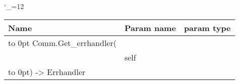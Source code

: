 \begingroup \catcode`\_=12 \tt
\begin{tabular}{lll}
\toprule
\textrm{Name}&\textrm{Param name}&\textrm{param type}\\
\midrule
\hbox to 0pt {Comm.Get_errhandler(\hss}\\
& self\\
\hbox to 0pt{) -> Errhandler\hss}\\
\bottomrule
\end{tabular}
\endgroup
